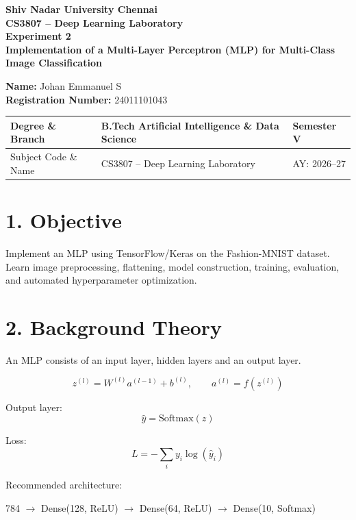 \documentclass[11pt]{article}
\begin{document}
\begin{center}
{\Large\textbf{Shiv Nadar University Chennai}}\\
\textbf{CS3807 -- Deep Learning Laboratory}\\
\textbf{Experiment 2}\\
{\large\textbf{Implementation of a Multi-Layer Perceptron (MLP) for Multi-Class Image Classification}}
\end{center}

\renewcommand{\arraystretch}{1.25}

\begin{flushleft}
\textbf{Name:} Johan Emmanuel S\\
\textbf{Registration Number:} 24011101043\\
\end{flushleft}

\begin{tabular}{|p{3.8cm}|p{8cm}|p{2cm}|}
\hline
Degree \& Branch & B.Tech Artificial Intelligence \& Data Science & Semester V\\ \hline
Subject Code \& Name & CS3807 -- Deep Learning Laboratory & AY: 2026--27\\ \hline
\end{tabular}

\section*{1. Objective}
Implement an MLP using TensorFlow/Keras on the Fashion-MNIST dataset. Learn image preprocessing, flattening, model construction, training, evaluation, and automated hyperparameter optimization.

\section*{2. Background Theory}
An MLP consists of an input layer, hidden layers and an output layer.

\[
z^{(l)}=W^{(l)}a^{(l-1)}+b^{(l)},\qquad
a^{(l)}=f(z^{(l)})
\]

Output layer:
\[
\hat y=\mathrm{Softmax}(z)
\]

Loss:
\[
L=-\sum_i y_i\log(\hat y_i)
\]

Recommended architecture:

\begin{center}
784 $\rightarrow$ Dense(128, ReLU) $\rightarrow$ Dense(64, ReLU) $\rightarrow$ Dense(10, Softmax)
\end{center}
\end{document}
